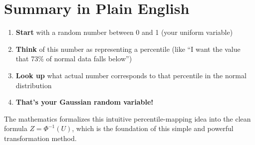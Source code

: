 \documentclass[12pt]{article}
\begin{document}
\section*{Summary in Plain English}

\begin{enumerate}
    \item \textbf{Start} with a random number between 0 and 1 (your uniform variable)
    \item \textbf{Think} of this number as representing a percentile (like ``I want the value that 73\% of normal data falls below'')
    \item \textbf{Look up} what actual number corresponds to that percentile in the normal distribution
    \item \textbf{That's your Gaussian random variable!}
\end{enumerate}

The mathematics formalizes this intuitive percentile-mapping idea into the clean formula \textbf{$Z = \Phi^{-1}(U)$}, which is the foundation of this simple and powerful transformation method.
\end{document}
